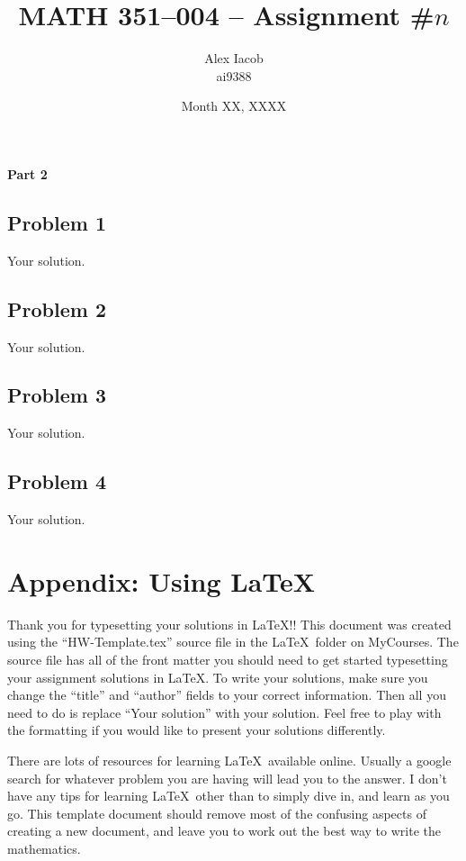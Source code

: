 \documentclass[10pt,a4paper]{article}
\title{MATH 351--004 -- Assignment \#$n$\\
}
\author{Alex Iacob\\
ai9388}
\date{Month XX, XXXX}
\begin{document}
\maketitle

\begin{center}
{\bf \large Part 2}
\end{center}

\subsection*{Problem 1}

Your solution.

\subsection*{Problem 2}

Your solution.

\subsection*{Problem 3}

Your solution.

\subsection*{Problem 4}

Your solution.



\section*{Appendix: Using \LaTeX}

Thank you for typesetting your solutions in \LaTeX!! This document was created using the ``HW-Template.tex'' source file in the \LaTeX\ folder on MyCourses. The source file  has all of the front matter you should need to get started typesetting your assignment solutions in \LaTeX. To write your solutions, make sure you change the ``title'' and ``author'' fields to your correct information. Then all you need to do is replace ``Your solution'' with your solution. Feel free to play with the formatting if you would like to present your solutions differently.

There are lots of resources for learning \LaTeX\ available online. Usually a google search for whatever problem you are having will lead you to the answer. I don't have any tips for learning \LaTeX\ other than to simply dive in, and learn as you go. This template document should remove most of the confusing aspects of creating a new document, and leave you to work out the best way to write the mathematics.
\end{document}
